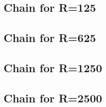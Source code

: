 \subsection{Chain for R=125} %
\label{sec:filter_frequency_responses:chain125}

%
%
\subsection{Chain for R=625} %
\label{sec:filter_frequency_responses:chain625}

%
%
\subsection{Chain for R=1250} %
\label{sec:filter_frequency_responses:chain1250}

%
%
\subsection{Chain for R=2500} %
\label{sec:filter_frequency_responses:chain2500}


